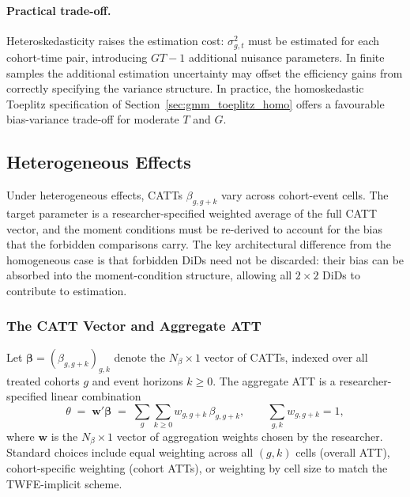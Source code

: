 \documentclass[12pt,letterpaper]{article}
\theoremstyle{remark}
\theoremstyle{definition}
\begin{document}
\paragraph{Practical trade-off.}
Heteroskedasticity raises the estimation cost: $\sigma_{g,t}^2$ must be
estimated for each cohort-time pair, introducing $GT-1$ additional nuisance
parameters. In finite samples the additional estimation uncertainty may
offset the efficiency gains from correctly specifying the variance structure.
In practice, the homoskedastic Toeplitz specification of
Section~\ref{sec:gmm_toeplitz_homo} offers a favourable bias-variance
trade-off for moderate $T$ and $G$.

\subsection{Heterogeneous Effects}
\label{sec:gmm_hetero}

Under heterogeneous effects, CATTs $\beta_{g,g+k}$ vary across cohort-event
cells. The target parameter is a researcher-specified weighted average of the
full CATT vector, and the moment conditions must be re-derived to account for
the bias that the forbidden comparisons carry. The key architectural difference
from the homogeneous case is that forbidden DiDs need not be discarded: their
bias can be absorbed into the moment-condition structure, allowing all
$2\times2$ DiDs to contribute to estimation.

\subsubsection{The CATT Vector and Aggregate ATT}
\label{sec:gmm_hetero_catt}

Let $\boldsymbol{\beta}=(\beta_{g,g+k})_{g,k}$ denote the $N_\beta\times1$
vector of CATTs, indexed over all treated cohorts $g$ and event horizons
$k\geq0$. The aggregate ATT is a researcher-specified linear combination
\begin{equation}
  \theta
  \;=\;
  \mathbf{w}'\boldsymbol{\beta}
  \;=\;
  \sum_{g}\sum_{k\geq0} w_{g,g+k}\,\beta_{g,g+k},
  \qquad
  \sum_{g,k}w_{g,g+k}=1,
  \label{eq:att_hetero}
\end{equation}
where $\mathbf{w}$ is the $N_\beta\times1$ vector of aggregation weights
chosen by the researcher. Standard choices include equal weighting across all
$(g,k)$ cells (overall ATT), cohort-specific weighting (cohort ATTs), or
weighting by cell size to match the TWFE-implicit scheme.
\end{document}
